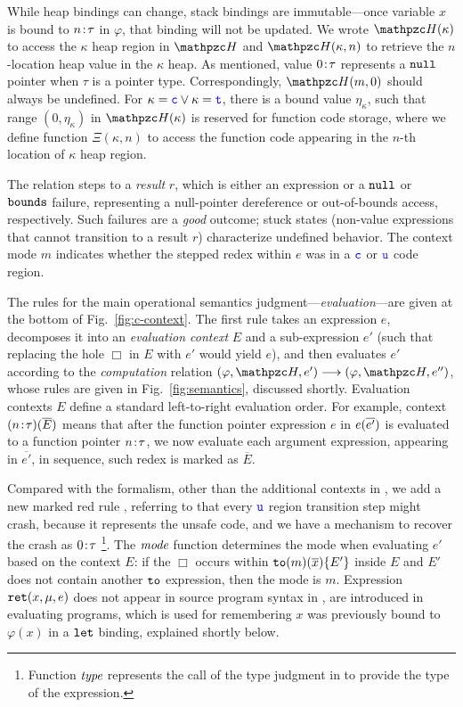 While heap bindings can change, stack bindings are immutable---once
variable $x$ is bound to ${n}\!:\!{\tau}$ in $\varphi$, that binding will not
be updated. 
We wrote $\heap(\kappa)$ to access the $\kappa$ heap region in $\heap$ and
$\heap(\kappa,n)$ to retrieve the $n$-location heap value in the $\kappa$ heap.
As mentioned, value ${0}\!:\!{\tau}$
represents a $\mathtt{null}$ pointer when $\tau$ is a pointer type.
Correspondingly, $\heap(m,0)$ should always be undefined.
For $\kappa=\textcolor{blue}{\texttt{c}} \vee \kappa = \textcolor{blue}{\texttt{t}}$, there is a bound value $\eta_{\kappa}$,
such that range $(0,\eta_{\kappa})$ in $\heap(\kappa)$ is reserved for function code storage, 
where we define function $\Xi(\kappa,n)$ to access the function code appearing in the $n$-th location of $\kappa$ heap region.

The relation steps to a \emph{result} $r$,
which is either an expression or a $\mathtt{null}$ or $\mathtt{bounds}$ failure,
representing a null-pointer dereference or out-of-bounds access,
respectively. Such failures are a \emph{good} outcome; stuck states
(non-value expressions that cannot transition to a result $r$)
characterize undefined behavior.
%
The context mode $m$ indicates whether the
stepped redex within $e$ was in a $\textcolor{blue}{\texttt{c}}$ or $\textcolor{blue}{\texttt{u}}$ code region.

The rules for the main operational semantics
judgment---\emph{evaluation}---are given at the bottom of
Fig.~\ref{fig:c-context}.
The first rule takes an expression $e$, decomposes
it into an \emph{evaluation context} $E$ and a sub-expression $e'$
(such that replacing the hole $\Box$ in $E$ with $e'$ would yield
$e$), and then evaluates $e'$ according to the \emph{computation}
  relation $(\varphi,\heap,e') \longrightarrow (\varphi,\heap,e'')$,
whose rules are given in Fig.~\ref{fig:semantics}, discussed
shortly. 
Evaluation contexts $E$ define a
standard left-to-right evaluation order.
For example, context ${({n}\!:\!{\tau})}({\overline{E}})$ means that after the function pointer expression $e$ in ${e}({\overline{e'}})$ is evaluated to a function pointer ${n}\!:\!{\tau}$, we now evaluate each argument expression, appearing in $\overline{e'}$, in sequence, such redex is marked as $\overline{E}$.

Compared with the \checkedc formalism, other than the additional contexts in ,
we add a new marked red rule ,
referring to that every $\textcolor{blue}{\texttt{u}}$ region transition step might crash, because it represents the unsafe code,
and we have a mechanism to recover the crash as ${0}\!:\!{\tau}$ \footnote{Function $\textit{type}$ represents the call of the type judgment in  to provide the type of the expression.}.
The $\textit{mode}$ function
determines the mode when evaluating $e'$ based on the context $E$:
if the $\Box$ occurs within $\mathtt{to}({m})(\overline{x})\{E'\}$ inside $E$ and $E'$ does not contain another $\mathtt{to}$ expression, 
then the mode is $m$.
Expression $\mathtt{ret}({x},{\mu},{e})$ does not appear in source program syntax in , are introduced in evaluating programs,
which is used for remembering $x$ was previously bound to
$\varphi(x)$ in a $\mathtt{let}$ binding, explained shortly below.

